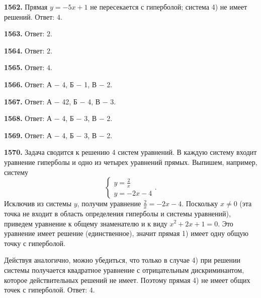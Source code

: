 \textbf{1562.}  Прямая $y=-5x+1$ не пересекается с гиперболой; система 4) не имеет решений. \newline \null \hspace*{\fill} Ответ: $4$.

\textbf{1563.} \newline \null \hspace*{\fill} Ответ: $2$.     

\textbf{1564.} \newline \null \hspace*{\fill} Ответ: $2$. 

\textbf{1565.} \newline \null \hspace*{\fill} Ответ: $4$.

\textbf{1566.} \newline \null \hspace*{\fill} Ответ:  А $-$ 4, Б $-$ 1, В $-$ 2.   

\textbf{1567.} \newline \null \hspace*{\fill} Ответ:  А $-$ 42, Б $-$ 4, В $-$ 3. 

\textbf{1568.} \newline \null \hspace*{\fill} Ответ:  А $-$ 4, Б $-$ 3, В $-$ 2.   

\textbf{1569.} \newline \null \hspace*{\fill} Ответ:  А $-$ 4, Б $-$ 3, В $-$ 2.  

\textbf{1570.}  Задача сводится к  решению 4 систем уравнений. В каждую систему входит уравнение гиперболы и одно из четырех уравнений прямых. Выпишем, например, систему  $$\begin{cases}
	y=\frac{2}{x}
	\\
	y=-2x-4	
\end{cases}.$$ Исключив из системы $y$, получим уравнение $\frac{2}{x}=-2x-4$. Поскольку $x\ne0$ (эта точка  не входит в область определения гиперболы и системы уравнений), приведем уравнение к общему знаменателю и к виду $x^2+2x+1=0$. Это уравнение имеет решение (единственное), значит прямая 1) имеет одну общую точку с гиперболой.

Действуя аналогично, можно убедиться, что только в случае 4) при решении системы получается квадратное уравнение с отрицательным дискриминантом, которое действительных решений не имеет. Поэтому прямая 4) не имеет общих точек с гиперболой. \newline \null \hspace*{\fill} Ответ: $4$.

